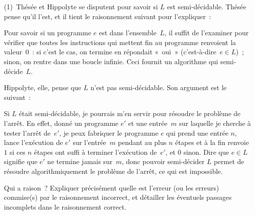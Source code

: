 \documentclass[12pt,a4paper]{article}
\theoremstyle{definition}
\begin{document}
\smallskip

(1) Thésée et Hippolyte se disputent pour savoir si $L$ est
semi-décidable.  Thésée pense qu'il l'est, et il tient le raisonnement
suivant pour l'expliquer :

{\narrower

Pour savoir si un programme $e$ est dans l'ensemble $L$, il suffit de
l'examiner pour vérifier que toutes les instructions qui mettent fin
au programme renvoient la valeur $0$ : si c'est le cas, on termine en
répondait « oui » (c'est-à-dire $e\in L$) ; sinon, on rentre dans une
boucle infinie.  Ceci fournit un algorithme qui semi-décide $L$.

\par}

\smallskip

\noindent Hippolyte, elle, pense que $L$ n'est pas semi-décidable.  Son
argument est le suivant :

{\narrower

Si $L$ était semi-décidable, je pourrais m'en servir pour résoudre le
problème de l'arrêt.  En effet, donné un programme $e'$ et une
entrée $m$ sur laquelle je cherche à tester l'arrêt de $e'$, je peux
fabriquer le programme $e$ qui prend une entrée $n$, lance l'exécution
de $e'$ sur l'entrée $m$ pendant au plus $n$ étapes et à la fin
renvoie $1$ si ces $n$ étapes ont suffi à terminer l'exécution
de $e'$, et $0$ sinon.  Dire que $e \in L$ signifie que $e'$ ne
termine jamais sur $m$, donc pouvoir semi-décider $L$ permet de
résoudre algorithmiquement le problème de l'arrêt, ce qui est
impossible.

\par}

\smallskip

\noindent Qui a raison ?  Expliquer précisément quelle est l'erreur
(ou les erreurs) commise(s) par le raisonnement incorrect, et
détailler les éventuels passages incomplets dans le raisonnement
correct.
\end{document}
